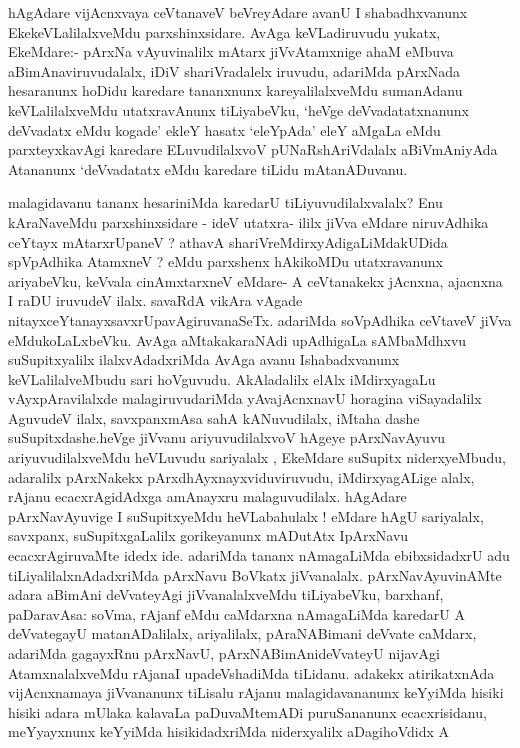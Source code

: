 \begin{artha}
hAgAdare vijAcnxvaya ceVtanaveV beVreyAdare avanU I shabadhxvanunx
EkekeVLalilalxveMdu parxshinxsidare. AvAga keVLadiruvudu yukatx,
EkeMdare:- pArxNa vAyuvinalilx mAtarx jiVvAtamxnige ahaM eMbuva
aBimAnaviruvudalalx, iDiV shariVradalelx iruvudu, adariMda pArxNada
hesaranunx hoDidu karedare tananxnunx kareyalilalxveMdu sumanAdanu
keVLalilalxveMdu utatxravAnunx tiLiyabeVku, `heVge deVvadatatxnanunx
deVvadatx eMdu kogade' ekleY hasatx `eleYpAda' eleY aMgaLa eMdu
parxteyxkavAgi karedare ELuvudilalxvoV pUNaRshAriVdalalx aBiVmAniyAda
Atananunx `deVvadatatx eMdu karedare tiLidu mAtanADuvanu. 
\end{artha}

\begin{artha}
malagidavanu tananx hesariniMda karedarU tiLiyuvudilalxvalalx? Enu
kAraNaveMdu parxshinxsidare - ideV utatxra- ililx jiVva eMdare
niruvAdhika ceYtayx mAtarxrUpaneV ? athavA
shariVreMdirxyAdigaLiMdakUDida spVpAdhika AtamxneV ? eMdu parxshenx
hAkikoMDu utatxravanunx ariyabeVku, keVvala cinAmxtarxneV eMdare- A
ceVtanakekx jAcnxna, ajacnxna I raDU iruvudeV ilalx. savaRdA vikAra
vAgade nitayxceYtanayxsavxrUpavAgiruvanaSeTx. adariMda soVpAdhika
ceVtaveV jiVva eMdukoLaLxbeVku. AvAga aMtakakaraNAdi upAdhigaLa
sAMbaMdhxvu suSupitxyalilx ilalxvAdadxriMda AvAga avanu Ishabadxvanunx
keVLalilalveMbudu sari hoVguvudu. AkAladalilx elAlx iMdirxyagaLu
vAyxpAravilalxde malagiruvudariMda yAvajAcnxnavU horagina viSayadalilx
AguvudeV ilalx, savxpanxmAsa sahA kANuvudilalx, iMtaha dashe
suSupitxdashe.heVge jiVvanu ariyuvudilalxvoV hAgeye pArxNavAyuvu
ariyuvudilalxveMdu heVLuvudu sariyalalx , EkeMdare suSupitx
niderxyeMbudu, adaralilx pArxNakekx pArxdhAyxnayxviduviruvudu,
iMdirxyagALige alalx, rAjanu ecacxrAgidAdxga amAnayxru
malaguvudilalx. hAgAdare pArxNavAyuvige I suSupitxyeMdu heVLabahulalx
! eMdare hAgU  sariyalalx, savxpanx, suSupitxgaLalilx gorikeyanunx
mADutAtx IpArxNavu ecacxrAgiruvaMte idedx ide. adariMda tananx
nAmagaLiMda ebibxsidadxrU adu tiLiyalilalxnAdadxriMda pArxNavu BoVkatx
jiVvanalalx. pArxNavAyuvinAMte adara aBimAni deVvateyAgi
jiVvanalalxveMdu tiLiyabeVku, barxhanf, paDaravAsa: soVma, rAjanf eMdu
caMdarxna nAmagaLiMda karedarU A deVvategayU matanADalilalx,
ariyalilalx, pAraNABimani deVvate caMdarx, adariMda gagayxRnu
pArxNavU, pArxNABimAnideVvateyU nijavAgi AtamxnalalxveMdu rAjanaI
upadeVshadiMda tiLidanu. adakekx atirikatxnAda vijAcnxnamaya
jiVvananunx tiLisalu rAjanu malagidavananunx keYyiMda hisiki hisiki
adara mUlaka kalavaLa paDuvaMtemADi puruSananunx ecacxrisidanu,
meYyayxnunx keYyiMda hisikidadxriMda niderxyalilx aDagihoVdidx A

\end{artha}
